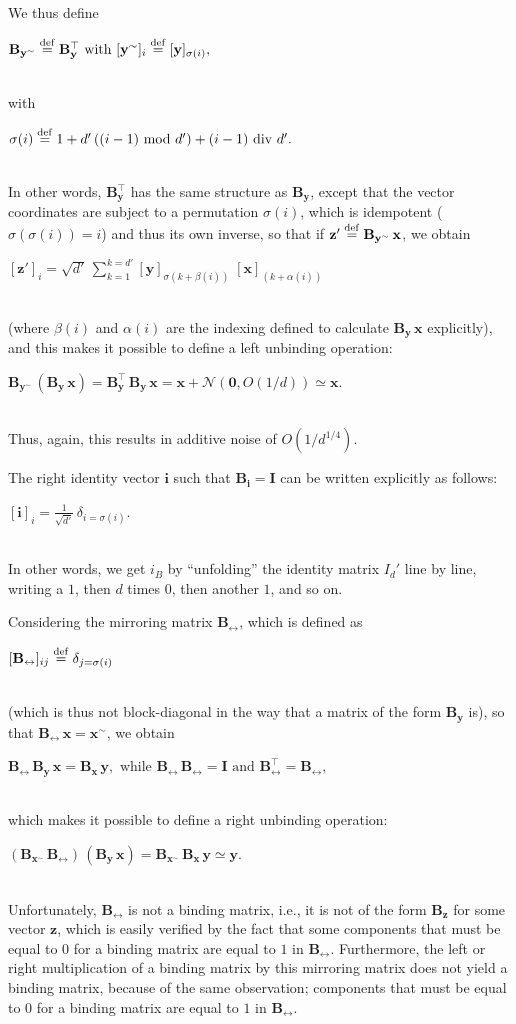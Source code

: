 \documentclass[sn-mathphys]{sn-jnl}
\newcommand{\defq}{\stackrel {\rm def}{=}}
\newcommand{\eqline}[1]{~\vspace{0.1cm}\\\centerline{$#1$}\vspace{0.1cm}\\}
\begin{document}
\begin{appendices}
We thus define
\eqline{\mathbf{B_{y^\sim}} \defq \mathbf{B_y^\top} \mbox{ with } [\mathbf{y^\sim}]_i \defq [\mathbf{y}]_{\sigma(i)},}
with
\eqline{\sigma(i) \defq  1 + d' \, ((i-1) \mbox{ mod } d') + (i-1) \mbox{ div } d'.}
In other words, $\mathbf{B_y^\top}$ has the same structure as $\mathbf{B_y}$, except that the vector coordinates are subject to a permutation $\sigma(i)$, which is idempotent ($\sigma(\sigma(i)) = i$) and thus its own inverse, so that if 
$\mathbf{z'} \defq \mathbf{B_{y^\sim}} \, \mathbf{x}$, we obtain
\eqline{[\mathbf{z'}]_i = \sqrt{d'} \, \sum_{k = 1}^{k = d'} [\mathbf{y}]_{\sigma(k + \beta(i))} \; [\mathbf{x}]_{(k + \alpha(i))}} (where $\beta(i)$ and $\alpha(i)$ are the indexing defined to calculate $\mathbf{B_{y}} \, \mathbf{x}$ explicitly), and this makes it possible to define a left unbinding operation:
\eqline{\mathbf{B_{y^\sim}} \, (\mathbf{B_y} \, \mathbf{x}) = \mathbf{B_y^\top} \, \mathbf{B_y} \, \mathbf{x}
  = \mathbf{x} + {\mathcal N}(\mathbf{0}, O(1/d)) \simeq \mathbf{x}.}
 Thus, again, this results in additive noise of $O(1/d^{1/4})$.

The right identity vector $\mathbf{\mathbf{i}}$ such that $\mathbf{B_{\mathbf{i}}} = \mathbf{I}$ can be written explicitly as follows:
\eqline{[\mathbf{\mathbf{i}}]_i = \frac{1}{\sqrt{d'}} \, \delta_{i = \sigma(i)}.}
In other words, we get $i_B$ by ``unfolding'' the identity matrix $I_d'$ line by line, writing a $1$, then $d$ times $0$, then another $1$, and so on.

Considering the mirroring matrix $\mathbf{B_{\leftrightarrow}}$, which is defined as
\eqline{[\mathbf{B_{\leftrightarrow}}]_{ij} \defq \delta_{j = \sigma(i)}}
(which is thus not block-diagonal in the way that a matrix of the form $\mathbf{B_y}$ is), so that $\mathbf{B_{\leftrightarrow}} \, \mathbf{x} = \mathbf{x}^\sim$, we obtain
\eqline{\mathbf{B_{\leftrightarrow}} \, \mathbf{B_y} \, \mathbf{x} = \mathbf{B_x} \, \mathbf{y},
\mbox{ while } \mathbf{B_{\leftrightarrow}} \,\mathbf{B_{\leftrightarrow}} = \mathbf{I} \mbox{ and } \mathbf{B_{\leftrightarrow}^\top} = \mathbf{B_{\leftrightarrow}},}
which makes it possible to define a right unbinding operation:
\eqline{(\mathbf{B_{x^\sim}} \, \mathbf{B_{\leftrightarrow}}) \, (\mathbf{B_y} \, \mathbf{x}) = \mathbf{B_{x^\sim}} \, \mathbf{B_x} \, \mathbf{y} \simeq \mathbf{y}.}

Unfortunately, $\mathbf{B_{\leftrightarrow}}$ is not a binding matrix, i.e., it is not of the form $\mathbf{B_z}$ for some vector $\mathbf{z}$, which is easily verified by the fact that some components that must be equal to $0$ for a binding matrix are equal to $1$ in $\mathbf{B_{\leftrightarrow}}$. Furthermore, the left or right multiplication of a binding matrix by this mirroring matrix does not yield a binding matrix, because of the same observation; components that must be equal to $0$ for a binding matrix are equal to $1$ in $\mathbf{B_{\leftrightarrow}}$.


\end{appendices}
\end{document}
